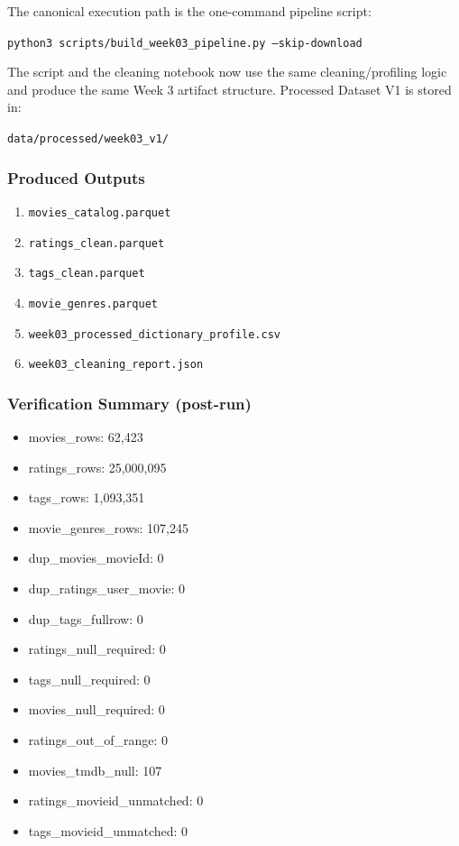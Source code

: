 \documentclass[11pt]{article}
\begin{document}
The canonical execution path is the one-command pipeline script:

\texttt{python3 scripts/build\_week03\_pipeline.py --skip-download}

The script and the cleaning notebook now use the same cleaning/profiling logic and produce the same Week 3 artifact structure. Processed Dataset V1 is stored in:

\texttt{data/processed/week03\_v1/}

\subsubsection*{Produced Outputs}

\begin{enumerate}[leftmargin=1.5em]
    \item \texttt{movies\_catalog.parquet}
    \item \texttt{ratings\_clean.parquet}
    \item \texttt{tags\_clean.parquet}
    \item \texttt{movie\_genres.parquet}
    \item \texttt{week03\_processed\_dictionary\_profile.csv}
    \item \texttt{week03\_cleaning\_report.json}
\end{enumerate}

\subsubsection*{Verification Summary (post-run)}

\begin{itemize}[leftmargin=1.5em]
    \item movies\_rows: 62,423
    \item ratings\_rows: 25,000,095
    \item tags\_rows: 1,093,351
    \item movie\_genres\_rows: 107,245
    \item dup\_movies\_movieId: 0
    \item dup\_ratings\_user\_movie: 0
    \item dup\_tags\_fullrow: 0
    \item ratings\_null\_required: 0
    \item tags\_null\_required: 0
    \item movies\_null\_required: 0
    \item ratings\_out\_of\_range: 0
    \item movies\_tmdb\_null: 107
    \item ratings\_movieid\_unmatched: 0
    \item tags\_movieid\_unmatched: 0
\end{itemize}
\end{document}
